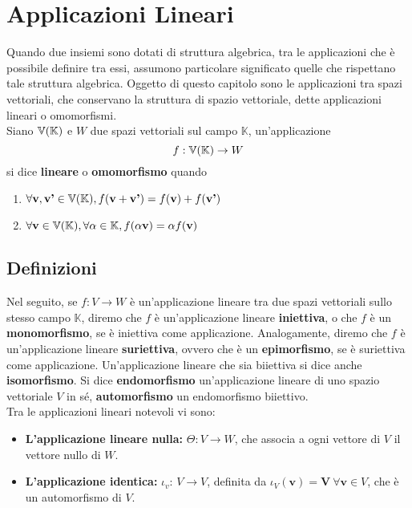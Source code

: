 \documentclass[../main.tex]{subfiles}
\begin{document}
\section{Applicazioni Lineari}
Quando due insiemi sono dotati di struttura algebrica, tra le applicazioni che
è possibile definire tra essi, assumono particolare significato quelle che
rispettano tale struttura algebrica. Oggetto di questo capitolo sono le
applicazioni tra spazi vettoriali, che conservano la struttura di spazio
vettoriale, dette applicazioni lineari o omomorfismi.\\ Siano $\mathbb{V} (\mathbb{K})$ e $W$ due
spazi vettoriali sul campo $\mathbb{K}$, un'applicazione
\[
    f: \mathbb{V} (\mathbb{K}) \rightarrow W
\]
si dice \textbf{lineare} o \textbf{omomorfismo} quando
\begin{enumerate}
    \item $\forall \textbf{v}, \textbf{v'} \in \mathbb{V} (\mathbb{K}), f(\textbf{v}+\textbf{v'}) = f(\textbf{v})+f(\textbf{v'})$
    \item $\forall \textbf{v} \in \mathbb{V} (\mathbb{K}), \forall \alpha \in \mathbb{K}, f(\alpha\textbf{v}) = \alpha f(\textbf{v})$
\end{enumerate}

\subsection{Definizioni}
Nel seguito, se $f: V\to W$ è un'applicazione lineare tra due spazi vettoriali
sullo stesso campo $\mathbb{K}$, diremo che $f$ è un'applicazione lineare
\textbf{iniettiva}, o che $f$ è un \textbf{monomorfismo}, se è iniettiva come
applicazione. Analogamente, diremo che $f$ è un'applicazione lineare
\textbf{suriettiva}, ovvero che è un \textbf{epimorfismo}, se è suriettiva come
applicazione. Un'applicazione lineare che sia biiettiva si dice anche
\textbf{isomorfismo}. Si dice \textbf{endomorfismo} un'applicazione lineare di
uno spazio vettoriale $V$ in sé, \textbf{automorfismo} un endomorfismo
biiettivo.\\ Tra le applicazioni lineari notevoli vi sono:
\begin{itemize}
    \item \textbf{L'applicazione lineare nulla:} $\Theta:V\to W$, che associa a ogni vettore di $V$ il vettore nullo di $W$.
    \item \textbf{L'applicazione identica:} $\iota_v$: $V\to V$, definita da $\iota_V(\textbf{v}) = \textbf{V}\ \forall \textbf{v}\in V$, che è un automorfismo di $V$.
\end{itemize}
\end{document}

